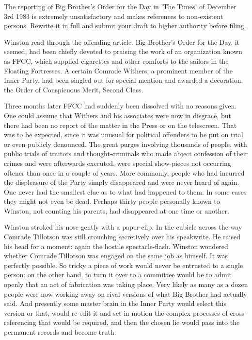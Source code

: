 \documentclass{article}
\begin{document}
The reporting of Big Brother's Order for the Day in 'The Times' of December
3rd 1983 is extremely unsatisfactory and makes references to non-existent
persons. Rewrite it in full and submit your draft to higher authority
before filing.


Winston read through the offending article. Big Brother's Order for the
Day, it seemed, had been chiefly devoted to praising the work of an
organization known as FFCC, which supplied cigarettes and other comforts
to the sailors in the Floating Fortresses. A certain Comrade Withers, a
prominent member of the Inner Party, had been singled out for special
mention and awarded a decoration, the Order of Conspicuous Merit, Second
Class.

Three months later FFCC had suddenly been dissolved with no reasons given.
One could assume that Withers and his associates were now in disgrace, but
there had been no report of the matter in the Press or on the telescreen.
That was to be expected, since it was unusual for political offenders to
be put on trial or even publicly denounced. The great purges involving
thousands of people, with public trials of traitors and thought-criminals
who made abject confession of their crimes and were afterwards executed,
were special show-pieces not occurring oftener than once in a couple of
years. More commonly, people who had incurred the displeasure of the
Party simply disappeared and were never heard of again. One never had the
smallest clue as to what had happened to them. In some cases they might
not even be dead. Perhaps thirty people personally known to Winston, not
counting his parents, had disappeared at one time or another.

Winston stroked his nose gently with a paper-clip. In the cubicle
across the way Comrade Tillotson was still crouching secretively over
his speakwrite. He raised his head for a moment: again the hostile
spectacle-flash. Winston wondered whether Comrade Tillotson was engaged
on the same job as himself. It was perfectly possible. So tricky a piece
of work would never be entrusted to a single person: on the other hand,
to turn it over to a committee would be to admit openly that an act of
fabrication was taking place. Very likely as many as a dozen people were
now working away on rival versions of what Big Brother had actually said.
And presently some master brain in the Inner Party would select this
version or that, would re-edit it and set in motion the complex processes
of cross-referencing that would be required, and then the chosen lie
would pass into the permanent records and become truth.
\end{document}
